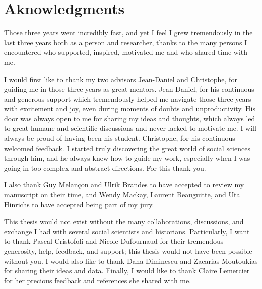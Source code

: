 \chapter*{Aknowledgments}

Those three years went incredibly fast, and yet I feel I grew tremendously in the last three years both as a person and researcher, thanks to the many persons I encountered who supported, inspired, motivated me and who shared time with me.


I would first like to thank my two advisors Jean-Daniel and Christophe, for guiding me in those three years as great mentors.
Jean-Daniel, for his continuous and generous support which tremendously helped me navigate those three years with excitement and joy, even during moments of doubts and unproductivity.
His door was always open to me for sharing my ideas and thoughts, which always led to great humane and scientific discussions and never lacked to motivate me.
I will always be proud of having been his student.
Christophe, for his continuous welcomed feedback.
I started truly discovering the great world of social sciences through him, and he always knew how to guide my work, especially when I was going in too complex and abstract directions. For this thank you.


I also thank Guy Melançon and Ulrik Brandes to have accepted to review my manuscript on their time, and Wendy Mackay, Laurent Beauguitte, and Uta Hinrichs to have accepted being part of my jury.


This thesis would not exist without the many collaborations, discussions, and exchange I had with several social scientists and historians.
Particularly, I want to thank Pascal Cristofoli and Nicole Dufournaud for their tremendous generosity, help, feedback, and support; this thesis would not have been possible without you.
I would also like to thank Dana Diminescu and Zacarias Moutoukias for sharing their ideas and data.
Finally, I would like to thank Claire Lemercier for her precious feedback and references she shared with me.


